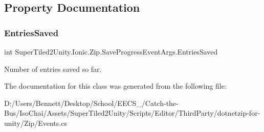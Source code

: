 \subsection{Property Documentation}
\mbox{\label{class_super_tiled2_unity_1_1_ionic_1_1_zip_1_1_save_progress_event_args_a1a946188def2ed37d54e47bec387fb8c}} 
\subsubsection{\texorpdfstring{Entries\+Saved}{EntriesSaved}}
{\footnotesize\ttfamily int Super\+Tiled2\+Unity.\+Ionic.\+Zip.\+Save\+Progress\+Event\+Args.\+Entries\+Saved\hspace{0.3cm}{\ttfamily [get]}}



Number of entries saved so far. 



The documentation for this class was generated from the following file\+:\begin{DoxyCompactItemize}
\item 
D\+:/\+Users/\+Bennett/\+Desktop/\+School/\+E\+E\+C\+S\+\_/\+Catch-\/the-\/\+Bus/\+Iso\+Chai/\+Assets/\+Super\+Tiled2\+Unity/\+Scripts/\+Editor/\+Third\+Party/dotnetzip-\/for-\/unity/\+Zip/Events.\+cs\end{DoxyCompactItemize}

